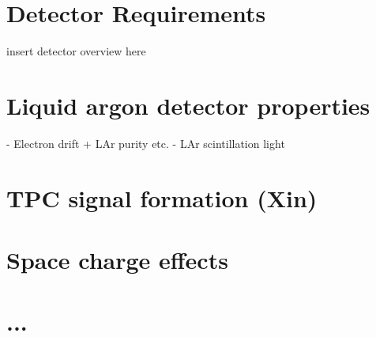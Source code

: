 
\section{Detector Requirements}

insert detector overview here

\section{Liquid argon detector properties}
- Electron drift + LAr purity etc.
- LAr scintillation light 

\section{TPC signal formation (Xin)}


\section{Space charge effects}

\section{...}
